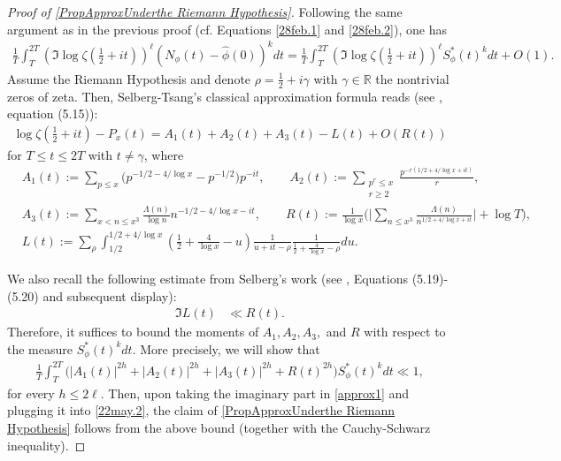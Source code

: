 \documentclass[12pt,oneside,english,a4paper]{amsart}
\theoremstyle{remark}
\numberwithin{equation}{section}
\newcommand{\Starphi}{S_\phi^*}
\begin{document}
\begin{proof}[Proof of \cref{PropApproxUnderthe Riemann Hypothesis}]
    Following the same argument as in the previous proof (cf. Equations \eqref{28feb.1} and \eqref{28feb.2}), one has
    \begin{align}\label{22may.2}
        \frac{1}{T} \int_T^{2T} (\Im\log\zeta(\tfrac12+it))^\ell (N_\phi(t)-\hat\phi(0))^k dt
        = \frac{1}{T}\int_T^{2T} (\Im\log\zeta(\tfrac12+it))^\ell \Starphi(t)^k dt 
        +O(1).
    \end{align}
    Assume the Riemann Hypothesis and denote $\rho=\frac12+i\gamma$ with $\gamma\in\mathbb R$ the nontrivial zeros of zeta. Then, Selberg-Tsang's classical approximation formula reads (see \cite{Tsang1}, equation (5.15)):
    \begin{align}\label{approx1} 
        \log \zeta(\tfrac12+it)- P_x(t) = A_1(t) +A_2(t) +A_3(t) -L(t) + O(R(t)) 
    \end{align}
    for $T\leq t\leq 2T$ with $t\neq\gamma$, where
    \begin{align*}
        &A_1(t):=\sum_{p\leq x}\big ( p^{-1/2-4/\log x}-p^{-1/2}\big )p^{-it},
        \quad\quad A_2(t):=\sum_{\substack{p^r\leq x \\ r\geq 2}}\frac{p^{-r(1/2+4/\log x+it)}}{r},\\
        &A_3(t):=\sum_{x<n\leq x^3}\frac{\Lambda(n)}{\log n}n^{-1/2-4/\log x-it},
        \quad\quad R(t):= \frac{1}{\log x}\bigg ( \bigg | \sum_{n\leq x^3}\frac{\Lambda (n)}{n^{1/2+4/\log x+it}} \bigg |+\log T \bigg ), \\
        &L(t):=\sum_\rho \int_{1/2}^{1/2+4/\log x}\left ( \frac{1}{2}+\frac{4}{\log x}-u \right )\frac{1}{u+it-\rho}\frac{1}{\frac{1}{2}+\frac{4}{\log x}-\rho}du.
    \end{align*}
    
    We also recall the following estimate from Selberg's work (see \cite[p. 71]{Tsang1}, Equations (5.19)-(5.20) and subsequent display):
    \begin{align}\label{30May.1}
        \Im L(t) &\ll R(t).    
    \end{align}
    Therefore, it suffices to bound the moments of $A_1,A_2,A_3,$ and $R$ with respect to the measure $\Starphi(t)^k dt$. More precisely, we will show that
    \begin{align}\label{23may.1}
    \frac{1}{T}\int_T^{2T} \Big(|A_1(t)|^{2h}+|A_2(t)|^{2h}+|A_3(t)|^{2h}+R(t)^{2h}\Big) \Starphi(t)^{k} dt \ll 1,
    \end{align}
    for every $h\leq 2\ell$.
    Then, upon taking the imaginary part in \eqref{approx1} and plugging it into \eqref{22may.2}, the claim of \cref{PropApproxUnderthe Riemann Hypothesis} follows from the above bound (together with the Cauchy-Schwarz inequality).


\end{proof}
\end{document}
